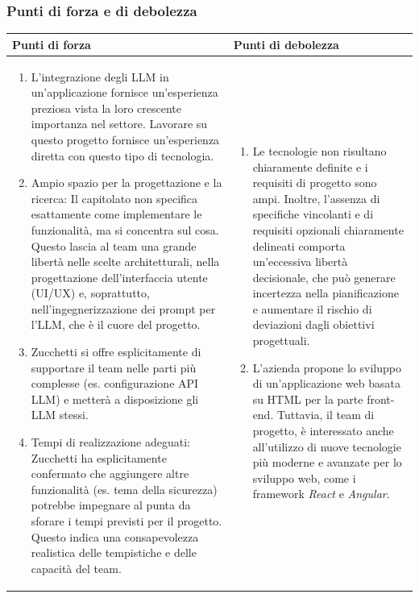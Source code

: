 \documentclass[a4paper,11pt]{article}
\begin{document}
\subsubsection{Punti di forza e di debolezza}
\newpage
{\footnotesize
\begin{tabularx}{\textwidth}{|X|X|}
\hline
\rowcolor{lightgray!40} %
\textbf{Punti di forza} & \textbf{Punti di debolezza} \\
\hline
\begin{enumerate}
\item L'integrazione degli LLM in un'applicazione fornisce un'esperienza preziosa vista la loro crescente importanza nel settore. Lavorare su questo progetto fornisce un'esperienza diretta con questo tipo di tecnologia.
\item Ampio spazio per la progettazione e la ricerca: Il capitolato non specifica esattamente come implementare le funzionalità, ma si concentra sul cosa. Questo lascia al team una grande libertà nelle scelte architetturali, nella progettazione dell'interfaccia utente (UI/UX) e, soprattutto, nell'ingegnerizzazione dei prompt per l'LLM, che è il cuore del progetto.
\item Zucchetti si offre esplicitamente di supportare il team nelle parti più complesse (es. configurazione API LLM) e metterà a disposizione gli LLM stessi. 
\item Tempi di realizzazione adeguati: Zucchetti ha esplicitamente confermato che aggiungere altre funzionalità (es. tema della sicurezza) potrebbe impegnare al punta da sforare i tempi previsti per il progetto. Questo indica una consapevolezza realistica delle tempistiche e delle capacità del team.
\end{enumerate}
 & \begin{enumerate}
\item Le tecnologie non risultano chiaramente definite e i requisiti di progetto sono ampi. Inoltre, l'assenza di specifiche vincolanti e di requisiti opzionali chiaramente delineati comporta un'eccessiva libertà decisionale, che può generare incertezza nella pianificazione e aumentare il rischio di deviazioni dagli obiettivi progettuali.
\item L'azienda propone lo sviluppo di un'applicazione web basata su HTML per la parte front-end. Tuttavia, il team di progetto, è interessato anche all'utilizzo di nuove tecnologie più moderne e avanzate per lo sviluppo web, come i framework \textit{React} e \textit{Angular}. 
\end{enumerate} \\
\hline
\end{tabularx}
}
\end{document}
